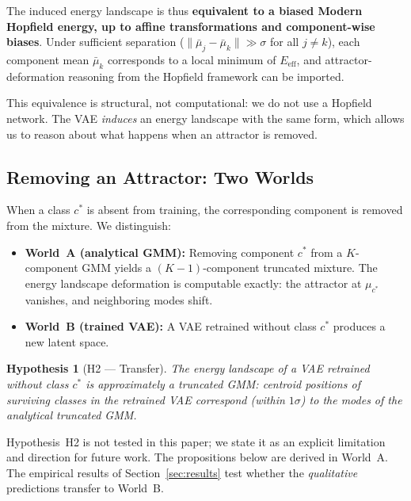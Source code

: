 \documentclass[11pt]{article}
\newtheorem{hypothesis}{Hypothesis}
\begin{document}
The induced energy landscape is thus \textbf{equivalent to a biased Modern
Hopfield energy, up to affine transformations and component-wise biases}.
Under sufficient separation ($\|\bar{\mu}_j - \bar{\mu}_k\| \gg \sigma$
for all $j \neq k$), each component mean $\bar{\mu}_k$ corresponds to a
local minimum of $E_{\text{eff}}$, and attractor-deformation reasoning
from the Hopfield framework can be imported.

This equivalence is structural, not computational: we do not use a Hopfield
network.
The VAE \emph{induces} an energy landscape with the same form, which allows
us to reason about what happens when an attractor is removed.


\subsection{Removing an Attractor: Two Worlds}
\label{sec:two_worlds}

When a class $c^*$ is absent from training, the corresponding component
is removed from the mixture.
We distinguish:

\begin{itemize}
\item \textbf{World~A (analytical GMM):}
Removing component $c^*$ from a $K$-component GMM yields a $(K{-}1)$-component
truncated mixture.
The energy landscape deformation is computable exactly: the attractor at
$\mu_{c^*}$ vanishes, and neighboring modes shift.

\item \textbf{World~B (trained VAE):}
A VAE retrained without class $c^*$ produces a new latent space.
\end{itemize}

\begin{hypothesis}[H2 --- Transfer]
\label{hyp:h2}
The energy landscape of a VAE retrained without class $c^*$ is approximately
a truncated GMM: centroid positions of surviving classes in the retrained VAE
correspond (within $1\sigma$) to the modes of the analytical truncated GMM.
\end{hypothesis}

\noindent Hypothesis~H2 is not tested in this paper; we state it as an explicit
limitation and direction for future work.
The propositions below are derived in World~A.
The empirical results of Section~\ref{sec:results} test whether the
\emph{qualitative} predictions transfer to World~B.
\end{document}
